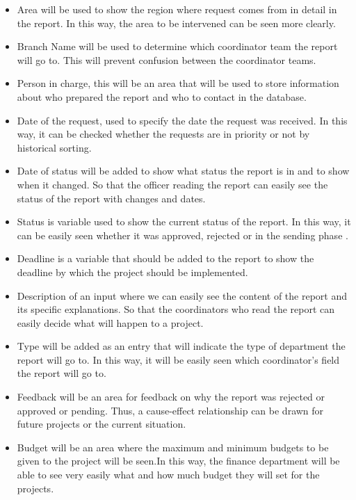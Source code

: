 \begin{itemize}
\item Area will be used to show the region where request comes from in detail in the report. In this way, the area to be intervened can be seen more clearly.
\item Branch Name will be used to determine which coordinator team the report will go to. This will prevent confusion between the coordinator teams.
\item Person in charge, this will be an area that will be used to store information about who prepared the report and who to contact in the database.
\item Date of the request, used to specify the date the request was received. In this way, it can be checked whether the requests are in priority or not by historical sorting.
\item Date of status will be added to show what status the report is in and to show when it changed. So that the officer reading the report can easily see the status of the report with changes and dates.
\item Status is variable used to show the current status of the report. In this way, it can be easily seen whether it was approved, rejected or in the sending phase .
\item Deadline is a variable that should be added to the report to show the deadline by which the project should be implemented.
\item Description of an input where we can easily see the content of the report and its specific explanations. So that the coordinators who read the report can easily decide what will happen to a project.
\item Type will be added as an entry that will indicate the type of department the report will go to. In this way, it will be easily seen which coordinator's field the report will go to.
\item Feedback will be an area for feedback on why the report was rejected or approved or pending. Thus, a cause-effect relationship can be drawn for future projects or the current situation.
\item Budget will be an area where the maximum and minimum budgets to be given to the project will be seen.In this way, the finance department will be able to see very easily what and how much budget they will set for the projects.
\end{itemize}

